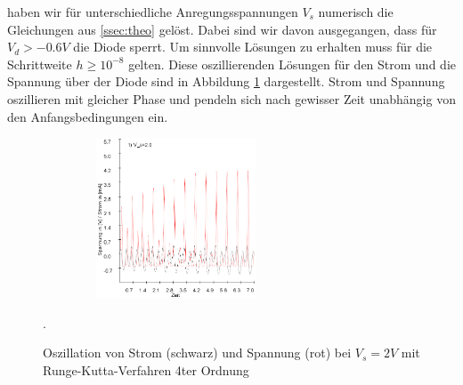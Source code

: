\documentclass[11,5pt, twoside]{article}
\begin{document}
haben wir für unterschiedliche Anregungsspannungen $V_s$ numerisch die Gleichungen aus  \ref{ssec:theo} gelöst. Dabei sind wir davon ausgegangen, dass für $V_d > -0.6V$ die Diode sperrt.
\newline
Um sinnvolle Lösungen zu erhalten muss für die Schrittweite $h \geq 10^{-8}$ gelten. Diese oszillierenden Lösungen für den Strom und die Spannung über der Diode sind in Abbildung \ref{fig:ldr-oszi} dargestellt. Strom und Spannung oszillieren mit gleicher Phase und pendeln sich nach gewisser Zeit unabhängig von den Anfangsbedingungen ein.
\begin{figure}[!htbp]
\centering
\includegraphics[height=180px,width=300px]{runge-oszillation-100k-2V}
\caption{Oszillation von Strom (schwarz) und Spannung (rot) bei $V_s=2V$ mit Runge-Kutta-Verfahren 4ter Ordnung}. 
\label{fig:ldr-oszi}
\end{figure}
\end{document}
